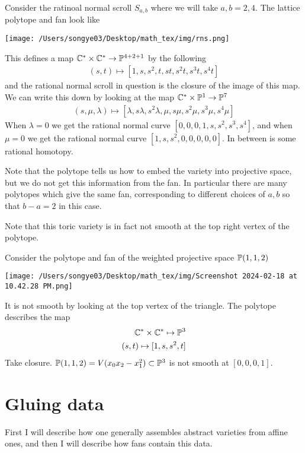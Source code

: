 \documentclass[12pt]{article}
\begin{document}
\begin{example}
	Consider the ratinoal normal scroll $S_{a,b}$ where we will take $a,b = 2,4$.
	The lattice polytope and fan look like \begin{center}
		\texttt{[image: /Users/songye03/Desktop/math\_tex/img/rns.png]}
	\end{center}
	This defines a map $\C^* \times \C^* \to \P^{4+2+1}$ by the following \begin{align*}
		(s,t)\mapsto [1,s,s^2,t,st,s^2t,s^3t,s^4t]
	\end{align*} and the rational normal scroll in question is the closure of the image of this map. We can write this down
	by looking at the map $\C^*\times \P^1 \to \P^7$ \begin{align*}
		(s,\mu,\lambda)\mapsto [\lambda,s\lambda, s^2\lambda, \mu, s\mu, s^2\mu, s^3\mu, s^4\mu]
	\end{align*} When $\lambda = 0$ we get the rational normal curve $[0,0,0,1,s,s^2,s^3,s^4]$, and when $\mu = 0$
	we get the rational normal curve $[1,s,s^2,0,0,0,0,0]$. In between is some rational homotopy.

	\hfill

	Note that the polytope tells us how to embed the variety into projective space, but we do not get this information
	from the fan. In particular there are many polytopes which give the same fan, corresponding to different choices of
	$a,b$ so that $b-a = 2$ in this case.

	\hfill

	Note that this toric variety is in fact not smooth at the top right vertex of the polytope.
\end{example}

\begin{example}
	Consider the polytope and fan of the weighted projective space $\P(1,1,2)$ \begin{center}
		\texttt{[image: /Users/songye03/Desktop/math\_tex/img/Screenshot 2024-02-18 at 10.42.28 PM.png]}
	\end{center}
	It is not smooth by looking at the top vertex of the triangle. The polytope describes the map \begin{align*}
		\C^*\times\C^* \mapsto \P^3 \\
		(s,t) \mapsto [1,s,s^2,t]
	\end{align*}
	Take closure. $\P(1,1,2) = V(x_0x_2 - x_1^2) \subset \P^3$ is not smooth at $[0,0,0,1]$.
\end{example}
\section{Gluing data}
First I will describe how one generally assembles abstract varieties from affine ones,
and then I will describe how fans contain this data.
\end{document}

